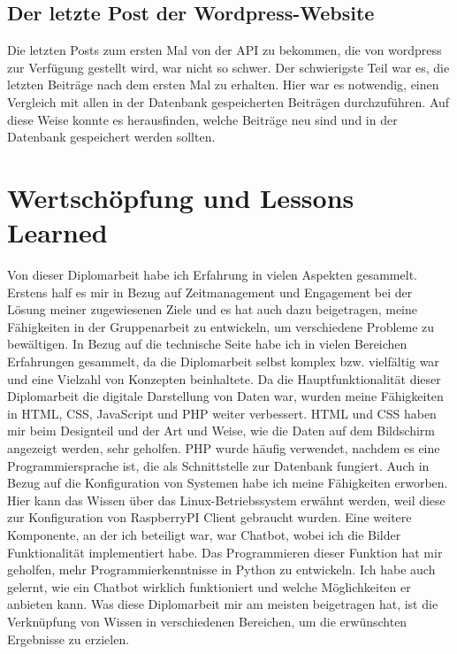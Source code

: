 \subsection{Der letzte Post der Wordpress-Website}

Die letzten Posts zum ersten Mal von der API zu bekommen, die von wordpress zur Verfügung gestellt wird, war nicht so schwer. Der schwierigste Teil war es, die letzten Beiträge nach dem ersten Mal zu erhalten. Hier war es notwendig, einen Vergleich mit allen in der Datenbank gespeicherten Beiträgen durchzuführen. Auf diese Weise konnte es herausfinden, welche Beiträge neu sind und in der Datenbank gespeichert werden sollten.


\section{Wertschöpfung und Lessons Learned}


Von dieser Diplomarbeit habe ich Erfahrung in vielen Aspekten gesammelt. Erstens half es mir in Bezug auf Zeitmanagement und Engagement bei der Lösung meiner zugewiesenen Ziele und es hat auch dazu beigetragen, meine Fähigkeiten in der Gruppenarbeit zu entwickeln, um verschiedene Probleme zu bewältigen. In Bezug auf die technische Seite habe ich in vielen Bereichen Erfahrungen gesammelt, da die Diplomarbeit selbst komplex bzw. vielfältig war und eine Vielzahl von Konzepten beinhaltete. Da die Hauptfunktionalität dieser Diplomarbeit die digitale Darstellung von Daten war, wurden meine Fähigkeiten in HTML, CSS, JavaScript und PHP weiter verbessert. HTML und CSS haben mir beim Designteil und der Art und Weise, wie die Daten auf dem Bildschirm angezeigt werden, sehr geholfen. PHP wurde häufig verwendet, nachdem es eine Programmiersprache ist, die als Schnittstelle zur Datenbank fungiert. Auch in Bezug auf die Konfiguration von Systemen habe ich meine Fähigkeiten erworben. Hier kann das Wissen über das Linux-Betriebssystem erwähnt werden, weil diese zur Konfiguration von RaspberryPI Client gebraucht wurden. Eine weitere Komponente, an der ich beteiligt war, war Chatbot, wobei ich die Bilder Funktionalität implementiert habe. Das Programmieren dieser Funktion hat mir geholfen, mehr Programmierkenntnisse in Python zu entwickeln. Ich habe auch gelernt, wie ein Chatbot wirklich funktioniert und welche Möglichkeiten er anbieten kann. Was diese Diplomarbeit mir am meisten beigetragen hat, ist die Verknüpfung von Wissen in verschiedenen Bereichen, um die erwünschten Ergebnisse zu erzielen.

